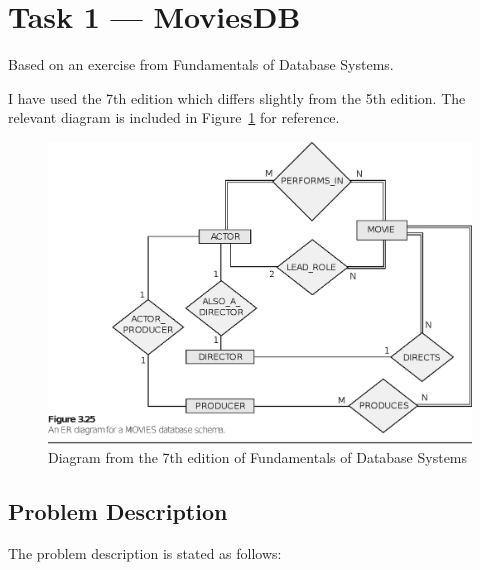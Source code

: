 %
%
%


\section{Task 1 --- MoviesDB}
Based on an exercise from Fundamentals of Database Systems\cite{2dv513:fds}.

I have used the 7th edition which differs slightly from the 5th edition.
The relevant diagram is included in Figure~\ref{fig:fds_3-25} for reference.


\begin{figure}[htbp]
  \centering
  \includegraphics[width=\linewidth]{include/fds_figure_3-25.eps}
	\caption{Diagram from the 7th edition of Fundamentals of Database
           Systems\cite{2dv513:fds}}
  \label{fig:fds_3-25}
\end{figure}


\subsection{Problem Description}
The problem description \cite{2dv513:assignment1-instructions} is stated as
follows:


